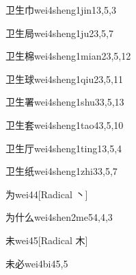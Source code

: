 \begin{verbete}{卫生巾}{wei4sheng1jin1}{3,5,3}
\end{verbete}

\begin{verbete}{卫生局}{wei4sheng1ju2}{3,5,7}
\end{verbete}

\begin{verbete}{卫生棉}{wei4sheng1mian2}{3,5,12}
\end{verbete}

\begin{verbete}{卫生球}{wei4sheng1qiu2}{3,5,11}
\end{verbete}

\begin{verbete}{卫生署}{wei4sheng1shu3}{3,5,13}
\end{verbete}

\begin{verbete}{卫生套}{wei4sheng1tao4}{3,5,10}
\end{verbete}

\begin{verbete}{卫生厅}{wei4sheng1ting1}{3,5,4}
\end{verbete}

\begin{verbete}{卫生纸}{wei4sheng1zhi3}{3,5,7}
\end{verbete}

\begin{verbete}{为}{wei4}{4}[Radical 丶]
\end{verbete}

\begin{verbete}{为什么}{wei4shen2me5}{4,4,3}
\end{verbete}

\begin{verbete}{未}{wei4}{5}[Radical 木]
\end{verbete}

\begin{verbete}{未必}{wei4bi4}{5,5}
\end{verbete}

